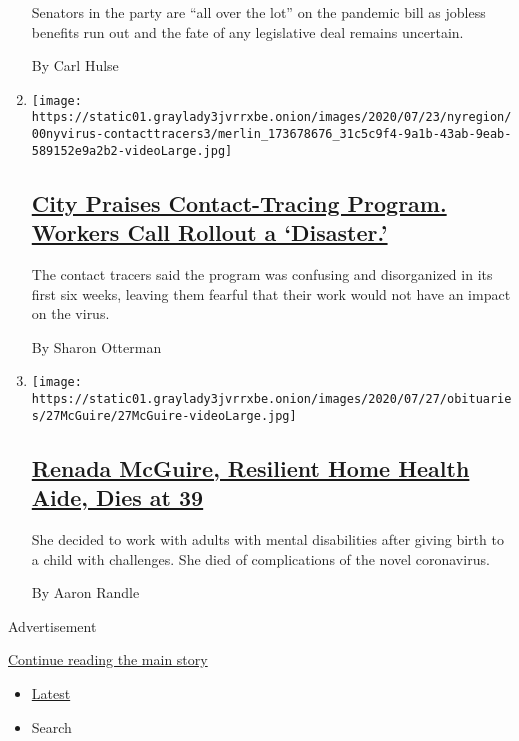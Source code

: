 \begin{enumerate}
  Senators in the party are ``all over the lot'' on the pandemic bill as
  jobless benefits run out and the fate of any legislative deal remains
  uncertain.

  By Carl Hulse
\item
  \texttt{[image: https://static01.graylady3jvrrxbe.onion/images/2020/07/23/nyregion/00nyvirus-contacttracers3/merlin\_173678676\_31c5c9f4-9a1b-43ab-9eab-589152e9a2b2-videoLarge.jpg]}

  \hypertarget{city-praises-contact-tracing-program-workers-call-rollout-a-disaster}{%
  \subsection{\texorpdfstring{\href{/2020/07/29/nyregion/new-york-contact-tracing.html}{City
  Praises Contact-Tracing Program. Workers Call Rollout a
  `Disaster.'}}{City Praises Contact-Tracing Program. Workers Call Rollout a `Disaster.'}}\label{city-praises-contact-tracing-program-workers-call-rollout-a-disaster}}

  The contact tracers said the program was confusing and disorganized in
  its first six weeks, leaving them fearful that their work would not
  have an impact on the virus.

  By Sharon Otterman
\item
  \texttt{[image: https://static01.graylady3jvrrxbe.onion/images/2020/07/27/obituaries/27McGuire/27McGuire-videoLarge.jpg]}

  \hypertarget{renada-mcguire-resilient-home-health-aide-dies-at-39}{%
  \subsection{\texorpdfstring{\href{/2020/07/29/obituaries/renada-mcguire-dead-coronavirus.html}{Renada
  McGuire, Resilient Home Health Aide, Dies at
  39}}{Renada McGuire, Resilient Home Health Aide, Dies at 39}}\label{renada-mcguire-resilient-home-health-aide-dies-at-39}}

  She decided to work with adults with mental disabilities after giving
  birth to a child with challenges. She died of complications of the
  novel coronavirus.

  By Aaron Randle
\end{enumerate}

Advertisement

\protect\hyperlink{after-mid2}{Continue reading the main story}

\begin{itemize}
\tightlist
\item
  \protect\hyperlink{stream-panel}{Latest}
\item
  Search
\end{itemize}

